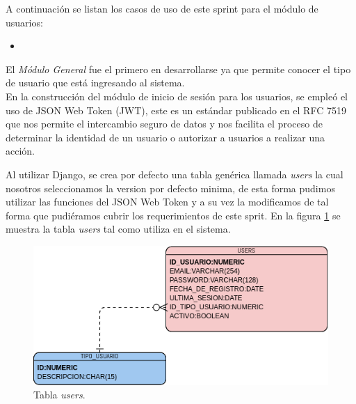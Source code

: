     A continuación se listan los casos de uso de este sprint para el módulo de usuarios:
    \begin{itemize}
        \item {}
    \end{itemize} 

        El \textit{Módulo General} fue el primero en desarrollarse ya que permite conocer el tipo de usuario
        que está ingresando al sistema.\\ 
        \newline        
        En la construcción del módulo de inicio de sesión para los usuarios, se empleó el uso de JSON Web Token (JWT), este es un 
        estándar publicado en el RFC 7519 que nos permite el intercambio seguro de datos y nos facilita el proceso de determinar la 
        identidad de un usuario o autorizar a usuarios a realizar una acción.

        Al utilizar Django, se crea por defecto una tabla genérica llamada \textit{users} la cual nosotros seleccionamos
        la version por defecto minima, de esta forma pudimos utilizar las funciones del JSON Web Token y a su vez la modificamos 
        de tal forma que pudiéramos cubrir los requerimientos de este sprit.
        En la figura \ref{tbdb:users} se muestra la tabla \textit{users} tal como utiliza en el sistema. 
        \begin{figure}[H]
            \begin{center}
                \includegraphics[width=.7\textwidth]{sprints/imagenes/sp1mdd.png}
            \end{center}
            
            \caption{Tabla \textit{users}.}
            \label{tbdb:users}
        \end{figure}
    
